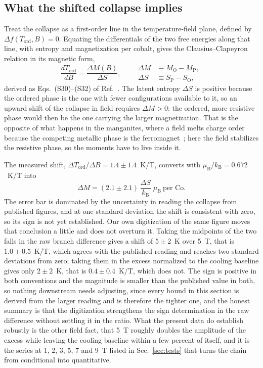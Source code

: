 \documentclass[reprint,twocolumn,prb,amsmath,amssymb,superscriptaddress,floatfix]{revtex4-2}
\newcommand{\kB}{k_{\mathrm{B}}}
\newcommand{\muBs}{\mu_{\mathrm{B}}}
\newcommand{\Tcol}{T_{\mathrm{ord}}}
\begin{document}
\subsection{What the shifted collapse implies}

Treat the collapse as a first-order line in the temperature-field plane, defined by
$\Delta f(\Tcol,B)=0$. Equating the differentials of the two free energies along that line,
with entropy and magnetization per cobalt, gives the Clausius--Clapeyron relation in its
magnetic form,
\begin{equation}
  \frac{d\Tcol}{dB} = \frac{\Delta M(B)}{\Delta S},
  \qquad
  \begin{aligned}
    \Delta M &\equiv M_{\mathrm{O}}-M_{\mathrm{P}},\\
    \Delta S &\equiv S_{\mathrm{P}}-S_{\mathrm{O}},
  \end{aligned}
  \label{eq:cc}
\end{equation}
derived as Eqs.~(S30)--(S32) of Ref.~\cite{SM}. The latent entropy $\Delta S$ is positive
because the ordered phase is the one with fewer configurations available to it, so an upward
shift of the collapse in field requires $\Delta M>0$: the ordered, more resistive phase would
then be the one carrying the larger magnetization. That is the opposite of what happens in
the manganites, where a field melts charge order because the competing metallic phase is the
ferromagnet~\cite{Kuwahara1995,Tokura2006}; here the field stabilizes the resistive phase, so
the moments have to live inside it.

The measured shift, $\Delta\Tcol/\Delta B=1.4\pm1.4$~K/T, converts with
$\muBs/\kB=0.672$~K/T into
\begin{equation}
  \Delta M = (2.1\pm2.1)\,\frac{\Delta S}{\kB}\;\muBs\ \text{per Co}.
  \label{eq:dM}
\end{equation}
The error bar is dominated by the uncertainty in reading the collapse from published figures,
and at one standard deviation the shift is consistent with zero, so its sign is not yet
established. Our own digitization of the same figure moves that conclusion a little and does not
overturn it. Taking the midpoints of the two falls in the raw branch difference gives a shift of
$5\pm2$~K over 5~T, that is $1.0\pm0.5$~K/T, which agrees with the published reading and reaches
two standard deviations from zero; taking them in the excess normalized to the cooling baseline
gives only $2\pm2$~K, that is $0.4\pm0.4$~K/T, which does not. The sign is positive in both
conventions and the magnitude is smaller than the published value in both, so nothing downstream
needs adjusting, since every bound in this section is derived from the larger reading and is
therefore the tighter one, and the honest summary is that the digitization strengthens the sign
determination in the raw difference without settling it in the ratio.
What the present data do establish robustly is
the other field fact, that 5~T roughly doubles the amplitude of the excess while leaving the
cooling baseline within a few percent of itself, and it is the series at 1, 2, 3, 5, 7 and 9~T
listed in Sec.~\ref{sec:tests} that turns the chain from conditional into quantitative.
\end{document}
